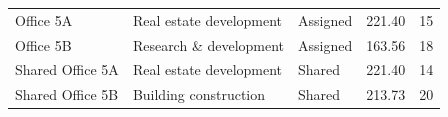 \begin{tabular}{@{}
    p{2.6cm}
    p{3.8cm}
    M{2.2cm}
    M{1.8cm}
    M{1.8cm}
    @{}}
    \toprule
     &
     &
     &
     &
     \\
    \midrule
    Office 5A & Real estate development & Assigned & 221.40 & 15 \\
    Office 5B & Research \& development & Assigned & 163.56 & 18 \\
    Shared Office 5A & Real estate development & Shared & 221.40 & 14 \\
    Shared Office 5B & Building construction   & Shared & 213.73 & 20 \\
    \bottomrule
\end{tabular}
